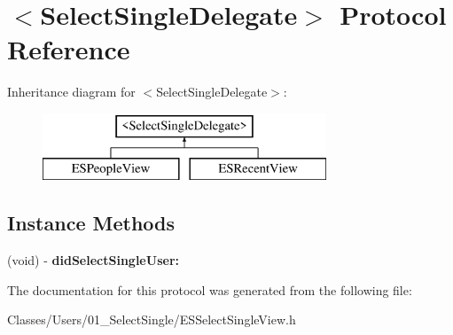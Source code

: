 \hypertarget{protocol_select_single_delegate-p}{}\section{$<$Select\+Single\+Delegate$>$ Protocol Reference}
\label{protocol_select_single_delegate-p}
Inheritance diagram for $<$Select\+Single\+Delegate$>$\+:\begin{figure}[H]
\begin{center}
\leavevmode
\includegraphics[height=2.000000cm]{protocol_select_single_delegate-p}
\end{center}
\end{figure}
\subsection*{Instance Methods}
\begin{DoxyCompactItemize}
\item 
\hypertarget{protocol_select_single_delegate-p_ae3799022179b33eedf9ede6d8d4e9af6}{}(void) -\/ {\bfseries did\+Select\+Single\+User\+:}\label{protocol_select_single_delegate-p_ae3799022179b33eedf9ede6d8d4e9af6}

\end{DoxyCompactItemize}


The documentation for this protocol was generated from the following file\+:\begin{DoxyCompactItemize}
\item 
Classes/\+Users/01\+\_\+\+Select\+Single/E\+S\+Select\+Single\+View.\+h\end{DoxyCompactItemize}
